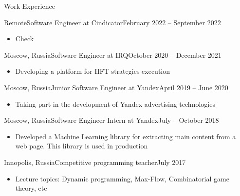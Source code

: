 \documentclass[]{cv/mcdowellcv}
\begin{document}
	\makeheader


        \begin{cvsection}{Work Experience}
            \begin{cvsubsection}{Remote}{Software Engineer at Cindicator}{February 2022 -- September 2022}
                \vskip 0.3cm
                \begin{itemize}
                    \item Check
                \end{itemize}
            \end{cvsubsection}
            \begin{cvsubsection}{Moscow, Russia}{Software Engineer at IRQ}{October 2020 -- December 2021}
                \vskip 0.3cm
                \begin{itemize}
                    \item Developing a platform for HFT strategies execution
                \end{itemize}
            \end{cvsubsection}
            \begin{cvsubsection}{Moscow, Russia}{Junior Software Engineer at Yandex}{April 2019 -- June 2020}
                \vskip 0.3cm
                \begin{itemize}
                    \item Taking part in the development of Yandex advertising technologies
                \end{itemize}
            \end{cvsubsection}
            \begin{cvsubsection}{Moscow, Russia}{Software Engineer Intern at Yandex}{July -- October 2018}
                \vskip 0.3cm
                \begin{itemize}
                    \item Developed a Machine Learning library for extracting main content from a web page. This library is used in production
                \end{itemize}
            \end{cvsubsection}
            \begin{cvsubsection}{Innopolis, Russia}{Competitive programming teacher}{July 2017}
                \vskip 0.3cm
                \begin{itemize}
                    \item Lecture topics: Dynamic programming, Max-Flow, Combinatorial game theory, etc
                \end{itemize}
            \end{cvsubsection}
        \end{cvsection}
\end{document}
